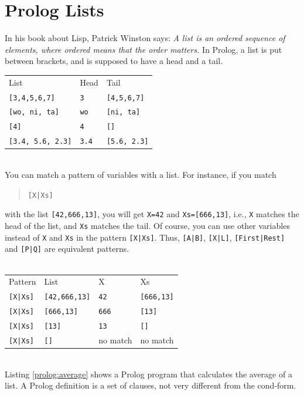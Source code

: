 \documentclass[a4paper,12pt]{book}
\begin{document}
\section{Prolog Lists}
In his book about Lisp, Patrick Winston says: {\em A list is an
ordered sequence of elements, where ordered means that the
order matters.} In Prolog, a list is put between brackets,
and is supposed to have a head and a tail.\\

\begin{tabular}{p{5cm}p{3cm}p{3cm}}
	List &  Head & Tail\\
	\verb|[3,4,5,6,7]| & \verb|3| & \verb|[4,5,6,7]|\\ 
	\verb|[wo, ni, ta]| & \verb|wo| & \verb|[ni, ta]|\\
	\verb|[4]| & \verb|4| & \verb|[]|\\
	\verb|[3.4, 5.6, 2.3]| & \verb|3.4| &  \verb|[5.6, 2.3]|\\ 
\end{tabular}

\verb||\\
You can match a pattern of variables with a list. For instance,
if you match
\begin{quote}
	\verb/[X|Xs]/
\end{quote}
with the list \verb|[42,666,13]|, you will get \verb|X=42| and
\verb|Xs=[666,13]|, i.e., \verb|X| matches the head of the list,
and \verb|Xs| matches the tail. Of course, you can use other
variables instead of \verb|X| and \verb|Xs| in the pattern
\verb/[X|Xs]/. Thus, \verb/[A|B]/, \verb/[X|L]/, \verb/[First|Rest]/
and \verb/[P|Q]/ are equivalent patterns.\\
\verb||\\
\begin{tabular}{p{3cm}p{3cm}p{3cm}p{3cm}}
	Pattern & List &  X & Xs\\
	\verb/[X|Xs]/ & \verb|[42,666,13]| & \verb|42| & \verb|[666,13]|\\ 
	\verb/[X|Xs]/ & \verb|[666,13]| & \verb|666| & \verb|[13]|\\
	\verb/[X|Xs]/ &  \verb|[13]| & \verb|13| & \verb|[]|\\
	\verb/[X|Xs]/ &  \verb|[]| & no match &  no match\\ 
\end{tabular}

\verb||\\
Listing \ref{prolog:average} shows a Prolog program that calculates
the average of a list. A Prolog definition is a set of clauses, not
very different from the cond-form.
\end{document}
